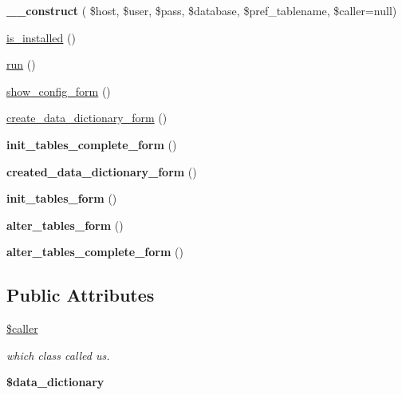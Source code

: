 \begin{DoxyCompactItemize}
{\bfseries \+\_\+\+\_\+construct} ( \$host, \$user, \$pass, \$database, \$pref\+\_\+tablename, \$caller=null)
\item 
\hyperlink{classksf__data__dictionary__ui_a0a29d77c9427ed3b3c76926f3810fab5}{is\+\_\+installed} ()
\item 
\hyperlink{classksf__data__dictionary__ui_a718a382712dc59fe7541a6dc77c5d1c0}{run} ()
\item 
\hyperlink{classksf__data__dictionary__ui_a3c01247145824cdf9ad196e2c1e1ad80}{show\+\_\+config\+\_\+form} ()
\item 
\hyperlink{classksf__data__dictionary__ui_ac0d782167419454b7bbba4a8aa3e98e1}{create\+\_\+data\+\_\+dictionary\+\_\+form} ()
\item 
\hypertarget{classksf__data__dictionary__ui_a40244068b94acbc83667a3db70a65dd8}{}\label{classksf__data__dictionary__ui_a40244068b94acbc83667a3db70a65dd8} 
{\bfseries init\+\_\+tables\+\_\+complete\+\_\+form} ()
\item 
\hypertarget{classksf__data__dictionary__ui_afbff679af2f43df46442270aa8684b88}{}\label{classksf__data__dictionary__ui_afbff679af2f43df46442270aa8684b88} 
{\bfseries created\+\_\+data\+\_\+dictionary\+\_\+form} ()
\item 
\hypertarget{classksf__data__dictionary__ui_ae72e2830a5968177c20c70884cc78e54}{}\label{classksf__data__dictionary__ui_ae72e2830a5968177c20c70884cc78e54} 
{\bfseries init\+\_\+tables\+\_\+form} ()
\item 
\hypertarget{classksf__data__dictionary__ui_a50ce94fab9edff56f02cb2cc5f64e8d5}{}\label{classksf__data__dictionary__ui_a50ce94fab9edff56f02cb2cc5f64e8d5} 
{\bfseries alter\+\_\+tables\+\_\+form} ()
\item 
\hypertarget{classksf__data__dictionary__ui_aec7ec64ecde5afe4ff026b0c2d4dea12}{}\label{classksf__data__dictionary__ui_aec7ec64ecde5afe4ff026b0c2d4dea12} 
{\bfseries alter\+\_\+tables\+\_\+complete\+\_\+form} ()
\end{DoxyCompactItemize}
\subsection*{Public Attributes}
\begin{DoxyCompactItemize}
\item 
\hypertarget{classksf__data__dictionary__ui_a5b4d8968def8c3345673618d845d9004}{}\label{classksf__data__dictionary__ui_a5b4d8968def8c3345673618d845d9004} 
\hyperlink{classksf__data__dictionary__ui_a5b4d8968def8c3345673618d845d9004}{\$caller}
\begin{DoxyCompactList}\small\item\em which class called us. \end{DoxyCompactList}\item 
\hypertarget{classksf__data__dictionary__ui_a44e50c035641328fa22cedc0c0d0b9dc}{}\label{classksf__data__dictionary__ui_a44e50c035641328fa22cedc0c0d0b9dc} 
{\bfseries \$data\+\_\+dictionary}
\end{DoxyCompactItemize}



